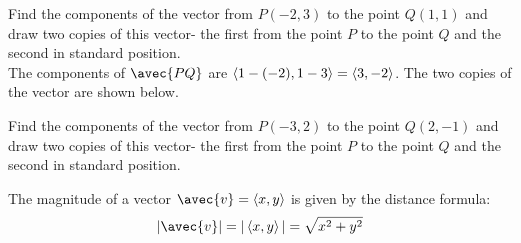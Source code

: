 \documentclass[handout]{ximera}
\begin{document}
\begin{example}
Find the components of the vector from $P(-2, 3)$ to the point $Q(1, 1)$ and draw two copies of this vector- the first from the point $P$ to the point $Q$
and the second in standard position.\\
The components of $\avec{PQ}$ are $\left\langle 1-(-2), 1-3\right\rangle = \left\langle 3, -2\right\rangle$.
The two copies of the vector are shown below.

\begin{image}
\end{image}

\end{example}

\begin{problem}
Find the components of the vector from $P(-3, 2)$ to the point $Q(2, -1)$ and draw two copies of this vector- the first from the point $P$ to the point $Q$
and the second in standard position.\\
\end{problem}

The magnitude of a vector $\avec{v} = \vector{x,y}$ is given by the distance formula:
\[
|\avec{v}| = |\vector{x,y}| = \sqrt{x^2 +y^2}
\]
\end{document}
